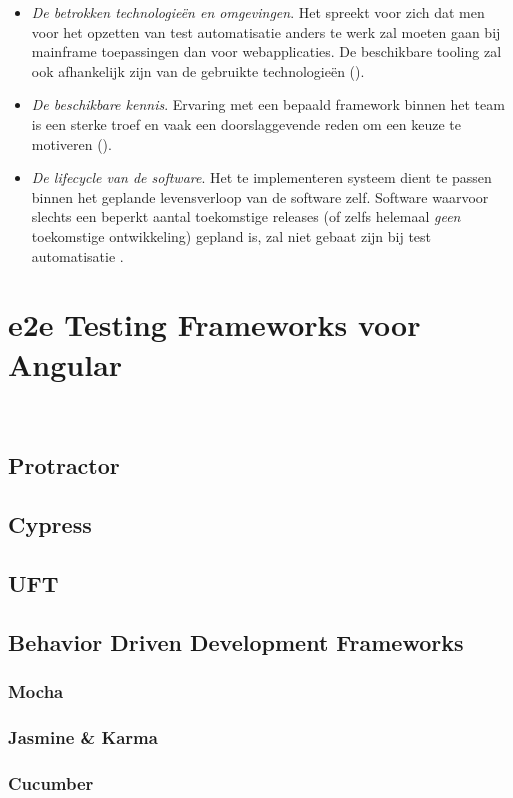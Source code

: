 \begin{itemize}
    \item \emph{De betrokken technologieën en omgevingen}. Het spreekt voor zich dat men voor het opzetten van test automatisatie anders te werk zal moeten gaan bij mainframe toepassingen dan voor webapplicaties. De beschikbare tooling zal ook afhankelijk zijn van de gebruikte technologieën (\cite{10.1145/1295014.1295062}).
    \item \emph{De beschikbare kennis}. Ervaring met een bepaald framework binnen het team is een sterke troef en vaak een doorslaggevende reden om een keuze te motiveren (\cite{Madan2013}).
    \item \emph{De lifecycle van de software}. Het te implementeren systeem dient te passen binnen het geplande levensverloop van de software zelf. Software waarvoor slechts een beperkt aantal toekomstige releases (of zelfs helemaal \emph{geen} toekomstige ontwikkeling) gepland is, zal niet gebaat zijn bij test automatisatie \autocite{Tiitinen2013}.
\end{itemize}

\section{e2e Testing Frameworks voor Angular}

~\cite{Singh2015}

\lipsum[4]

\subsection{Protractor}

\lipsum[6-7]

\subsection{Cypress}

\lipsum[3-4]

\subsection{UFT}

\lipsum[3-4]

\subsection{Behavior Driven Development Frameworks}

\lipsum[9]

\subsubsection{Mocha}

\lipsum[8-10]

\subsubsection{Jasmine \& Karma}

\lipsum[8-10]

\subsubsection{Cucumber}

\lipsum[8-10]